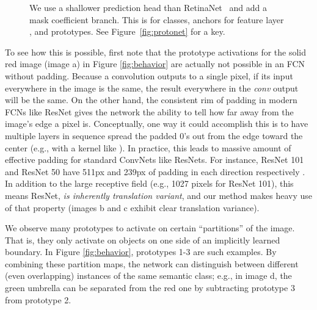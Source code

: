\documentclass[10pt,journal,compsoc]{IEEEtran}
\begin{document}
    \begin{figure}
    \centering
    
\caption{ We use a shallower prediction head than RetinaNet~\cite{retinanet} and add a mask coefficient branch. This is for  classes,  anchors for feature layer , and  prototypes. See Figure~\ref{fig:protonet} for a key.}
\label{fig:pred_head}
\end{figure}     
To see how this is possible, first note that the prototype activations for the solid red image (image a) in Figure \ref{fig:behavior} are actually not possible in an FCN without padding. Because a convolution outputs to a single pixel, if its input everywhere in the image is the same, the result everywhere in the \textit{conv} output will be the same. On the other hand, the consistent rim of padding in modern FCNs like ResNet gives the network the ability to tell how far away from the image's edge a pixel is. Conceptually, one way it could accomplish this is to have multiple layers in sequence spread the padded 0's out from the edge toward the center (e.g., with a kernel like ). In practice, this leads to massive amount of effective padding for standard ConvNets like ResNets. For instance, ResNet 101 and ResNet 50 have 511px and 239px of padding in each direction respectively \cite{araujo2019computing}. In addition to the large receptive field (e.g., 1027 pixels for ResNet 101), this means ResNet, \textit{is inherently translation variant}, and our method makes heavy use of that property (images b and c exhibit clear translation variance).

We observe many prototypes to activate on certain ``partitions'' of the image. That is, they only activate on objects on one side of an implicitly learned boundary. In Figure \ref{fig:behavior}, prototypes 1-3 are such examples. By combining these partition maps, the network can distinguish between different (even overlapping) instances of the same semantic class; e.g., in image d, the green umbrella can be separated from the red one by subtracting prototype 3 from prototype 2.
\end{document}
